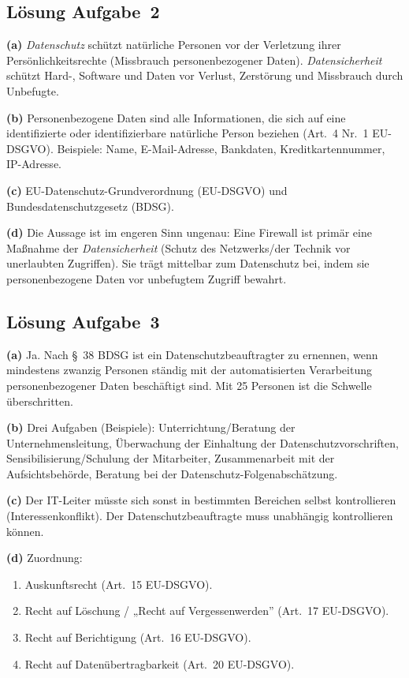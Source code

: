 \documentclass[11pt, a4paper]{article}
\begin{document}
\subsection*{Lösung Aufgabe~2}
\begin{loesung}
\textbf{(a)} \emph{Datenschutz} schützt natürliche Personen vor der Verletzung ihrer
Persönlichkeitsrechte (Missbrauch personenbezogener Daten). \emph{Datensicherheit}
schützt Hard-, Software und Daten vor Verlust, Zerstörung und Missbrauch durch Unbefugte.

\textbf{(b)} Personenbezogene Daten sind alle Informationen, die sich auf eine
identifizierte oder identifizierbare natürliche Person beziehen (Art.~4 Nr.~1
EU-DSGVO). Beispiele: Name, E-Mail-Adresse, Bankdaten, Kreditkartennummer, IP-Adresse.

\textbf{(c)} EU-Datenschutz-Grundverordnung (EU-DSGVO) und Bundesdatenschutzgesetz
(BDSG).

\textbf{(d)} Die Aussage ist im engeren Sinn ungenau: Eine Firewall ist primär eine
Maßnahme der \emph{Datensicherheit} (Schutz des Netzwerks/der Technik vor unerlaubten
Zugriffen). Sie trägt mittelbar zum Datenschutz bei, indem sie personenbezogene Daten
vor unbefugtem Zugriff bewahrt.
\end{loesung}

\subsection*{Lösung Aufgabe~3}
\begin{loesung}
\textbf{(a)} Ja. Nach \S~38 BDSG ist ein Datenschutzbeauftragter zu ernennen, wenn
mindestens zwanzig Personen ständig mit der automatisierten Verarbeitung personenbezogener
Daten beschäftigt sind. Mit 25 Personen ist die Schwelle überschritten.

\textbf{(b)} Drei Aufgaben (Beispiele): Unterrichtung/Beratung der Unternehmensleitung,
Überwachung der Einhaltung der Datenschutzvorschriften, Sensibilisierung/Schulung der
Mitarbeiter, Zusammenarbeit mit der Aufsichtsbehörde, Beratung bei der
Datenschutz-Folgenabschätzung.

\textbf{(c)} Der IT-Leiter müsste sich sonst in bestimmten Bereichen selbst kontrollieren
(Interessenkonflikt). Der Datenschutzbeauftragte muss unabhängig kontrollieren können.

\textbf{(d)} Zuordnung:
\begin{enumerate}[label=\arabic*., itemsep=0pt]
  \item Auskunftsrecht (Art.~15 EU-DSGVO).
  \item Recht auf Löschung / „Recht auf Vergessenwerden” (Art.~17 EU-DSGVO).
  \item Recht auf Berichtigung (Art.~16 EU-DSGVO).
  \item Recht auf Datenübertragbarkeit (Art.~20 EU-DSGVO).
\end{enumerate}
\end{loesung}
\end{document}
